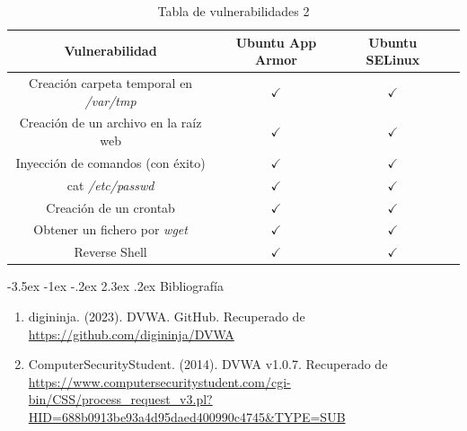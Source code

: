 \documentclass[11pt]{report}
\makeatletter
\renewcommand\chapter{\@startsection{chapter}{0}{\z@}%
    {-3.5ex \@plus -1ex \@minus -.2ex}%
    {2.3ex \@plus.2ex}%
    {\normalfont\Large\bfseries}}
\makeatother
\begin{document}
\begin{table}[H]
  \centering
  \begin{tabular}{|c|c|c|c|}
    \hline
    \textbf{Vulnerabilidad}                      & \textbf{Ubuntu App Armor} & \textbf{Ubuntu SELinux} \\ \hline
    Creación carpeta temporal en \emph{/var/tmp} & $\checkmark$              & $\checkmark$            \\ \hline
    Creación de un archivo en la raíz web        & $\checkmark$              & $\checkmark$            \\ \hline
    Inyección de comandos (con éxito)            & $\checkmark$              & $\checkmark$            \\ \hline
    cat \emph{/etc/passwd}                       & $\checkmark$              & $\checkmark$            \\ \hline
    Creación de un crontab                       & $\checkmark$              & $\checkmark$            \\ \hline
    Obtener un fichero por \emph{wget}           & $\checkmark$              & $\checkmark$            \\ \hline
    Reverse Shell                                & $\checkmark$              & $\checkmark$            \\ \hline
  \end{tabular}
  \caption{Tabla de vulnerabilidades 2}
\end{table}

\chapter{Bibliografía} %
\begin{enumerate}
  \item digininja. (2023). DVWA. GitHub. Recuperado de \url{https://github.com/digininja/DVWA}
  \item ComputerSecurityStudent. (2014). DVWA v1.0.7. Recuperado de \url{https://www.computersecuritystudent.com/cgi-bin/CSS/process_request_v3.pl?HID=688b0913be93a4d95daed400990c4745&TYPE=SUB}
\end{enumerate}
\end{document}
